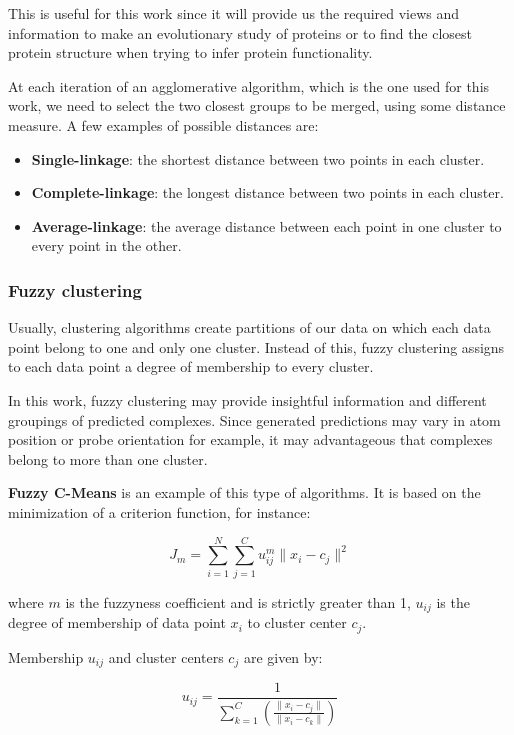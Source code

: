 This is useful for this work since it will provide us the required views and information to make an evolutionary study of proteins or to find the closest protein structure when trying to infer protein functionality.

At each iteration of an agglomerative algorithm, which is the one used for this work, we need to select the two closest groups to be merged, using some distance measure. A few examples of possible distances are:

\begin{itemize}
	\item \textbf{Single-linkage}: the shortest distance between two points in each cluster.
	\item \textbf{Complete-linkage}: the longest distance between two points in each cluster.
	\item \textbf{Average-linkage}: the average distance between each point in one cluster to every point in the other.
\end{itemize}

\subsubsection{Fuzzy clustering}
Usually, clustering algorithms create partitions of our data on which each data point belong to one and only one cluster. Instead of this, fuzzy clustering \cite{jain1999data} assigns to each data point a degree of membership to every cluster.

In this work, fuzzy clustering may provide insightful information and different groupings of predicted complexes. Since generated predictions may vary in atom position or probe orientation for example, it may advantageous that complexes belong to more than one cluster.

\textbf{Fuzzy C-Means} is an example of this type of algorithms. It is based on the minimization of a criterion function, for instance:

$$J_m = \sum_{i=1}^{N}\sum_{j=1}^{C} u_{ij}^m \parallel x_i - c_j \parallel^2 $$

where $m$ is the fuzzyness coefficient and is strictly greater than 1, $u_{ij}$ is the degree of membership of data point $x_i$ to cluster center $c_j$.

Membership $u_{ij}$ and cluster centers $c_j$ are given by:

$$u_{ij} = \frac{1}{\sum_{k=1}^{C} \left( \frac{\parallel x_i - c_j \parallel}{\parallel x_i - c_k \parallel} \right) }$$


